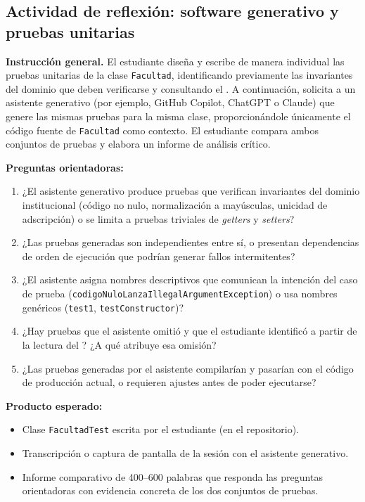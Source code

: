 \subsection*{Actividad de reflexión: software generativo y pruebas unitarias}
\label{act:ia-sprint10}

\begin{tcolorbox}[actividadIA,
  title={Actividad de reflexión (Sprint~10) ---
         Software generativo y pruebas unitarias}]

\textbf{Instrucción general.}
El estudiante diseña y escribe de manera individual las pruebas unitarias de la clase
\texttt{Facultad}, identificando previamente las invariantes del dominio que deben
verificarse y consultando el \acuerdo. A continuación, solicita a un asistente generativo
(por ejemplo, GitHub Copilot, ChatGPT o Claude) que genere las mismas pruebas para la misma
clase, proporcionándole únicamente el código fuente de \texttt{Facultad} como contexto.
El estudiante compara ambos conjuntos de pruebas y elabora un informe de análisis crítico.

\bigskip
\textbf{Preguntas orientadoras:}
\begin{enumerate}[label=\arabic*.]
  \item ¿El asistente generativo produce pruebas que verifican invariantes del dominio
        institucional (código no nulo, normalización a mayúsculas, unicidad de adscripción)
        o se limita a pruebas triviales de \textit{getters} y \textit{setters}?
  \item ¿Las pruebas generadas son independientes entre sí, o presentan dependencias de
        orden de ejecución que podrían generar fallos intermitentes?
  \item ¿El asistente asigna nombres descriptivos que comunican la intención del caso de
        prueba (\texttt{codigoNuloLanzaIllegalArgumentException}) o usa nombres genéricos
        (\texttt{test1}, \texttt{testConstructor})?
  \item ¿Hay pruebas que el asistente omitió y que el estudiante identificó a partir de
        la lectura del \acuerdo? ¿A qué atribuye esa omisión?
  \item ¿Las pruebas generadas por el asistente compilarían y pasarían con el código de
        producción actual, o requieren ajustes antes de poder ejecutarse?
\end{enumerate}

\bigskip
\textbf{Producto esperado:}
\begin{itemize}
  \item Clase \texttt{FacultadTest} escrita por el estudiante (en el repositorio).
  \item Transcripción o captura de pantalla de la sesión con el asistente generativo.
  \item Informe comparativo de 400--600 palabras que responda las preguntas orientadoras
        con evidencia concreta de los dos conjuntos de pruebas.
\end{itemize}


\end{tcolorbox}

